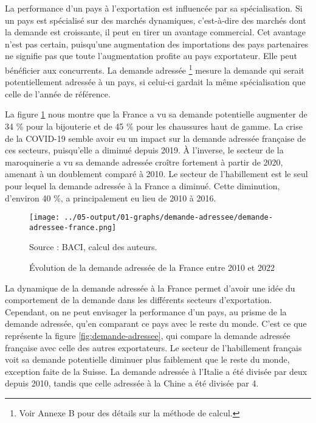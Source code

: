 \documentclass[french,10pt,a4paper]{article}
\begin{document}

La performance d'un pays à l'exportation est influencée par sa spécialisation. Si un pays est spécialisé sur des marchés dynamiques, c'est-à-dire des marchés dont la demande est croissante, il peut en tirer un avantage commercial. Cet avantage n'est pas certain, puisqu'une augmentation des importations des pays partenaires ne signifie pas que toute l'augmentation profite au pays exportateur. Elle peut bénéficier aux concurrents. La demande adressée \footnote{Voir Annexe B pour des détails sur la méthode de calcul.} mesure la demande qui serait potentiellement adressée à un pays, si celui-ci gardait la même spécialisation que celle de l'année de référence.

La figure \ref{fig:demande-adressee-france} nous montre que la France a vu sa demande potentielle augmenter de 34 \% pour la bijouterie et de 45 \% pour les chaussures haut de gamme. La crise de la COVID-19 semble avoir eu un impact sur la demande adressée française de ces secteurs, puisqu'elle a diminué depuis 2019. À l'inverse, le secteur de la maroquinerie a vu sa demande adressée croître fortement à partir de 2020, amenant à un doublement comparé à 2010. Le secteur de l'habillement est le seul pour lequel la demande adressée à la France a diminué. Cette diminution, d'environ 40 \%, a principalement eu lieu de 2010 à 2016.

\begin{figure}[!h]
  \centering  \texttt{[image: ../05-output/01-graphs/demande-adressee/demande-adressee-france.png]}
  \captionsetup{justification=raggedright,singlelinecheck=false, font=small}
  \caption*{Source : BACI, calcul des auteurs.}
  \captionsetup{justification=centering, singlelinecheck=true, font=normalsize}
  \caption{Évolution de la demande adressée de la France entre 2010 et 2022}
  \label{fig:demande-adressee-france}
\end{figure}

La dynamique de la demande adressée à la France permet d'avoir une idée du comportement de la demande dans les différents secteurs d'exportation. Cependant, on ne peut envisager la performance d'un pays, au prisme de la demande adressée, qu'en comparant ce pays avec le reste du monde. C'est ce que représente la figure \ref{fig:demande-adressee}, qui compare la demande adressée française avec celle des autres exportateurs. Le secteur de l'habillement français voit sa demande potentielle diminuer plus faiblement que le reste du monde, exception faite de la Suisse. La demande adressée à l'Italie a été divisée par deux depuis 2010, tandis que celle adressée à la Chine a été divisée par 4.
\end{document}
